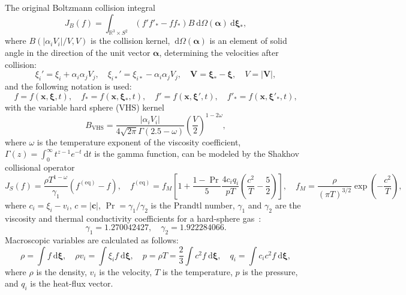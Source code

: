 \documentclass{aip-cp}
\newcommand{\dd}{\:\mathrm{d}}
\newcommand{\dxi}{\dd\boldsymbol{\xi}}
\newcommand{\bxi}{\boldsymbol{\xi}}
\newcommand{\bx}{\boldsymbol{x}}
\begin{document}
The original Boltzmann collision integral
\begin{equation}\label{eq:ci}
    J_B(f) = \int_{\mathbb{R}^3\times S^2} (f'f'_* - ff_*) B \dd \Omega(\boldsymbol{\alpha}) \dxi_*,
\end{equation}
where \(B(|\alpha_i V_i|/V,V)\) is the collision kernel, \(\dd \Omega(\boldsymbol{\alpha})\) is an element of solid angle
in the direction of the unit vector \(\boldsymbol{\alpha}\), determining the velocities after collision:
\begin{equation}\label{eq:after_collision}
    \xi_i' = \xi_i + \alpha_i\alpha_j V_j, \quad \xi_{i*}' = \xi_{i*} - \alpha_i\alpha_j V_j, \quad
    \boldsymbol{V} = \bxi_*-\bxi, \quad V = |\boldsymbol{V}|,
\end{equation}
and the following notation is used:
\begin{equation}\label{eq:Boltzmann_notation}
    f = f(\bx,\bxi,t), \quad f_* = f(\bx,\bxi_*,t), \quad
    f' = f(\bx,\bxi',t), \quad f'_* = f(\bx,\bxi'_*,t),
\end{equation}
with the variable hard sphere (VHS) kernel~\cite{Bird1981vhs}
\begin{equation}\label{eq:ci_kernel_vhs}
    B_\mathrm{VHS} = \frac{|\alpha_i V_i|}{4\sqrt{2\pi}\Gamma(2.5-\omega)}\left(\frac{V}2\right)^{1-2\omega},
\end{equation}
where \(\omega\) is the temperature exponent of the viscosity coefficient,
\(\Gamma(z) = \int_0^\infty t^{z-1}e^{-t}\dd{t}\) is the gamma function,
can be modeled by the Shakhov collisional operator
\begin{equation}\label{eq:Shakhov}
    J_S(f) = \frac{\rho T^{1-\omega}}{\gamma_1}\left(f^{\mathrm{(eq)}} - f\right), \quad
    f^{\mathrm{(eq)}} = f_M\left[ 1 + \frac{1-\Pr}5\frac{4c_i q_i}{pT}\left(\frac{c^2}{T}-\frac52\right) \right], \quad
    f_M = \frac{\rho}{(\pi T)^{3/2}}\exp\left(-\frac{c^2}{T}\right),
\end{equation}
where \(c_i = \xi_i - v_i\), \(c = |\boldsymbol{c}|\), \(\Pr=\gamma_1/\gamma_2\) is the Prandtl number,
\(\gamma_1\) and \(\gamma_2\) are the viscosity and thermal conductivity coefficients for a hard-sphere gas~\cite{Sone2007}:
\begin{equation}\label{eq:gammas}
    \gamma_1 = 1.270042427, \quad \gamma_2 = 1.922284066.
\end{equation}
Macroscopic variables are calculated as follows:
\begin{equation}\label{eq:macro}
    \rho = \int f \dxi, \quad
    \rho v_i = \int \xi_i f \dxi, \quad
    p = \rho T = \frac23\int c^2 f \dxi, \quad
    q_i = \int c_i c^2 f \dxi,
\end{equation}
where \(\rho\) is the density, \(v_i\) is the velocity, \(T\) is the temperature, \(p\) is the pressure,
and \(q_i\) is the heat-flux vector.
\end{document}

